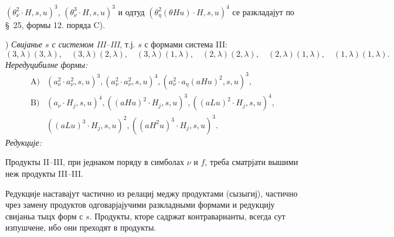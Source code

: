 ﻿\documentclass[11pt]{article}
\begin{document}
$(\theta_\nu^2\cdot H,s,u)^3$, $(\theta_\nu^3\cdot H,s,u)^3$ и одтуд $(\theta_\eta^2(\theta Hu)\cdot H,s,u)^4$ се разкладајут по \S\ 25, формы 12. поряда \mbox{C)}.

) \textit{Свијанье $s$ с системом III--III}, т.ј. $s$ с формами система III:
\[
(3,\lambda)(3,\lambda),\quad (3,\lambda)(2,\lambda),\quad (3,\lambda)(1,\lambda),\quad
(2,\lambda)(2,\lambda),\quad (2,\lambda)(1,\lambda),\quad
(1,\lambda)(1,\lambda).
\]
\noindent\textit{Нередуцибилне формы:}
\[
\begin{array}{rl}
\mbox{A)}&(a_\nu^2\cdot a_\nu^2,s,u)^3,
(a_\nu^2\cdot a_\nu^2,s,u)^4,
(a_\nu^2\cdot a_\eta(aHu)^2,s,u)^3,\\[0.45em]
\mbox{B)}&(a_\nu\cdot H_j,s,u)^4,
((aHu)^2\cdot H_j,s,u)^3,
((aLu)^2\cdot H_j,s,u)^4,\\[0.25em]
&((aLu)^3\cdot H_j,s,u)^2,
((aH^2u)^3\cdot H_j,s,u)^3.
\end{array}
\]
\noindent\textit{Редукције:}

Продукты II--III, при једнаком поряду в симболах $\nu$ и $f$, треба сматрјати вышими неж продукты III--III.

Редукције наставајут частично из релациј меджу продуктами (сызыгиј), частично чрез замену продуктов одговарјајучими разкладными формами и редукцију свијаньа тыцх форм с $s$. Продукты, кторе садржат контраварианты, всегда сут изпушчене, ибо они преходят в продукты.
\end{document}
